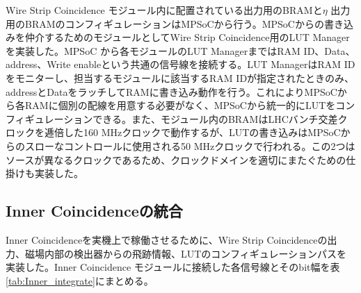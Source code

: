 Wire Strip Coincidence モジュール内に配置されている\pt 出力用のBRAMと$\eta$ 出力用のBRAMのコンフィギュレーションはMPSoCから行う。MPSoCからの書き込みを仲介するためのモジュールとしてWire Strip Coincidence用のLUT Managerを実装した。MPSoC から各モジュールのLUT ManagerまではRAM ID、Data、address、Write enableという共通の信号線を接続する。LUT ManagerはRAM IDをモニターし、担当するモジュールに該当するRAM IDが指定されたときのみ、addressとDataをラッチしてRAMに書き込み動作を行う。これによりMPSoCから各RAMに個別の配線を用意する必要がなく、MPSoCから統一的にLUTをコンフィギュレーションできる。また、モジュール内のBRAMはLHCバンチ交差クロックを逓倍した160 MHzクロックで動作するが、LUTの書き込みはMPSoCからのスローなコントロールに使用される50 MHzクロックで行われる。この2つはソースが異なるクロックであるため、クロックドメインを適切にまたぐための仕掛けも実装した。

\subsection{Inner Coincidenceの統合}
Inner Coincidenceを実機上で稼働させるために、Wire Strip Coincidenceの出力、磁場内部の検出器からの飛跡情報、LUTのコンフィギュレーションパスを実装した。Inner Coincidence モジュールに接続した各信号線とそのbit幅を表\ref{tab:Inner_integrate}にまとめる。

